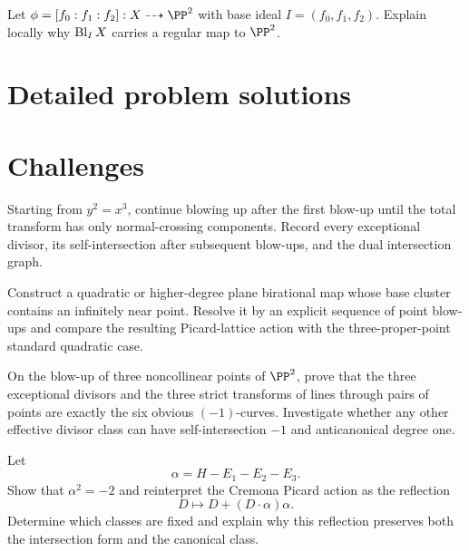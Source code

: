 \begin{problem}\label{prob:vi45-12}
Let \(\phi=[f_0:f_1:f_2]:X\dashrightarrow\PP^2\) with base ideal \(I=(f_0,f_1,f_2)\).  Explain locally why \(\operatorname{Bl}_I X\) carries a regular map to \(\PP^2\).
\end{problem}

\ifdefined\FullProblemDossiers
\section{Detailed problem solutions}

\fi

\section{Challenges}

\begin{problem}\label{chal:vi45-01}
Starting from \(y^2=x^3\), continue blowing up after the first blow-up until the total transform has only normal-crossing components.  Record every exceptional divisor, its self-intersection after subsequent blow-ups, and the dual intersection graph.
\end{problem}

\begin{problem}\label{chal:vi45-02}
Construct a quadratic or higher-degree plane birational map whose base cluster contains an infinitely near point.  Resolve it by an explicit sequence of point blow-ups and compare the resulting Picard-lattice action with the three-proper-point standard quadratic case.
\end{problem}

\begin{problem}\label{chal:vi45-03}
On the blow-up of three noncollinear points of \(\PP^2\), prove that the three exceptional divisors and the three strict transforms of lines through pairs of points are exactly the six obvious \((-1)\)-curves.  Investigate whether any other effective divisor class can have self-intersection \(-1\) and anticanonical degree one.
\end{problem}

\begin{problem}\label{chal:vi45-04}
Let
\[
  \alpha=H-E_1-E_2-E_3.
\]
Show that \(\alpha^2=-2\) and reinterpret the Cremona Picard action as the reflection
\[
  D\longmapsto D+(D\cdot\alpha)\alpha.
\]
Determine which classes are fixed and explain why this reflection preserves both the intersection form and the canonical class.
\end{problem}

